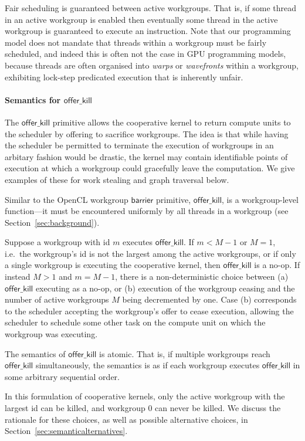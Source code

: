 \documentclass[nocopyrightspace,10pt]{sigplanconf}
\newcommand{\offerkill}{\mathsf{offer\_kill}}
\begin{document}
Fair scheduling is guaranteed between active workgroups.  That is, if
some thread in an active workgroup is enabled then eventually some
thread in the active workgroup is guaranteed to execute an
instruction.  Note that our programming model does not mandate that
threads within a workgroup must be fairly scheduled, and indeed this
is often not the case in GPU programming models, because threads are
often organised into \emph{warps} or \emph{wavefronts} within a
workgroup, exhibiting lock-step predicated execution that is
inherently unfair.

\paragraph{Semantics for $\offerkill$}

The $\offerkill$ primitive allows the cooperative kernel to return
compute units to the scheduler by offering to sacrifice workgroups.
The idea is that while having the scheduler be permitted to terminate
the execution of workgroups in an arbitary fashion would be drastic,
the kernel may contain identifiable points of execution at which a
workgroup could gracefully leave the computation.  We give examples of
these for work stealing and graph traversal below.

Similar to the OpenCL workgroup $\mathsf{barrier}$ primitive,
$\offerkill$, is a workgroup-level function---it must be encountered
uniformly by all threads in a workgroup (see
Section~\ref{sec:background}).

Suppose a workgroup with id $m$ executes $\offerkill$.  If $m < M-1$
or $M=1$, i.e.\ the workgroup's id is not the largest among the active
workgroups, or if only a single workgroup is executing the cooperative
kernel, then $\offerkill$ is a no-op.  If instead $M > 1$ and $m =
M-1$, there is a non-deterministic choice between (a) $\offerkill$
executing as a no-op, or (b) execution of the workgroup ceasing and
the number of active workgroups $M$ being decremented by one.  Case
(b) corresponds to the scheduler accepting the workgroup's offer to
cease execution, allowing the scheduler to schedule some other task on
the compute unit on which the workgroup was executing.

The semantics of $\offerkill$ is atomic.  That is, if multiple
workgroups reach $\offerkill$ simultaneously, the semantics is as if
each workgroup executes $\offerkill$ in some arbitrary sequential
order.

In this formulation of cooperative kernels, only the active workgroup
with the largest id can be killed, and workgroup 0 can never be
killed.  We discuss the rationale for these choices, as well as
possible alternative choices, in
Section~\ref{sec:semanticalternatives}.
\end{document}
